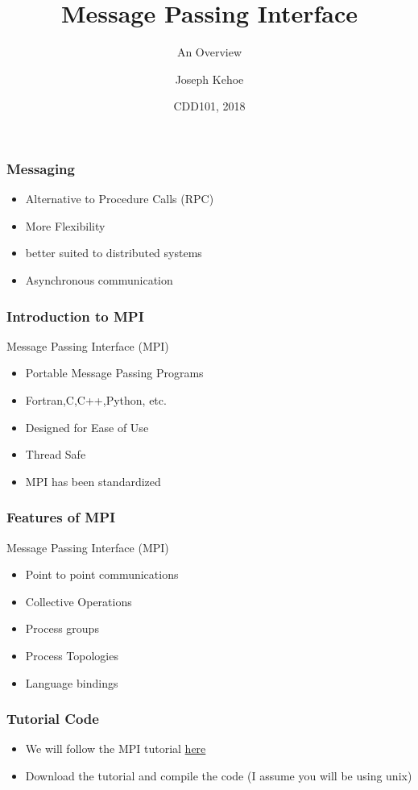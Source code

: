 \documentclass{beamer}
\title[MPI] %
{Message Passing Interface}
\subtitle{An Overview}
\author[Dr. Joseph Kehoe] %
{Joseph Kehoe\inst{1}}
\institute[IT Carlow] %
{
	\inst{1}%
	Department of Computing and Networking\\
	Institute of Technology Carlow
}
\date[ITC 2018] %
{CDD101, 2018}
\begin{document}
 
\frame{\titlepage}
 
 

    \begin{frame}
    	\frametitle{Messaging}
    	\begin{itemize}
    		\item Alternative to Procedure Calls (RPC)
    		\item More Flexibility
    		\item better suited to distributed systems
    		\item Asynchronous communication
    	\end{itemize}
    \end{frame}
  \begin{frame}
  	\frametitle{Introduction to MPI}
Message Passing Interface (MPI)
  	\begin{itemize}
  		\item Portable Message Passing Programs
  		\item Fortran,C,C++,Python, etc.
  		\item Designed for Ease of Use
  		\item Thread Safe
  		\item MPI has been standardized
  	\end{itemize}
  \end{frame}
   \begin{frame} 
    	\frametitle{Features of MPI}
    	Message Passing Interface (MPI)
    	\begin{itemize}
    		\item Point to point communications
    		\item Collective Operations
    		\item Process groups
    		\item Process Topologies
    		\item Language bindings
    	\end{itemize}
    \end{frame}

 
 
     \begin{frame}
     	\frametitle{Tutorial Code}
     	\begin{itemize}
     		\item We will follow the MPI tutorial \href{https://github.com/wesleykendall/mpitutorial}{here}
     		\item Download the tutorial and compile the code (I assume you will be using unix)
     	\end{itemize}

     \end{frame}
     
\end{document}
